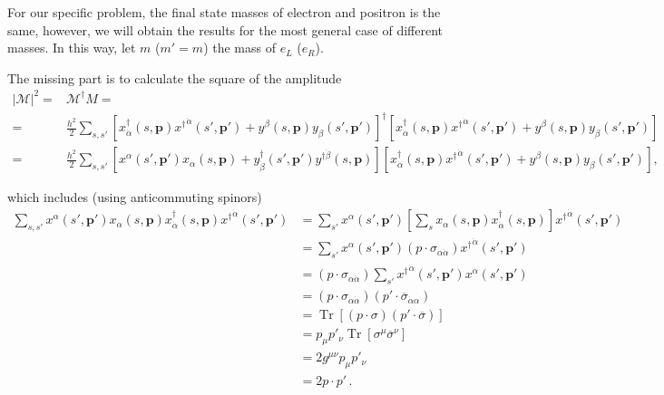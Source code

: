 For our specific problem, the final state masses of electron and positron is the same, however, we will obtain the results for the most general case of different masses. In this way, let $m$ ($m'=m$) the mass of $e_L$ ($e_R$).

The missing part is to calculate the square of the amplitude
\begin{align}
  \left| \mathcal{M} \right|^2=&\mathcal{M}^{\dagger}M= \nonumber\\
=&\frac{h^{2}}{2}\sum_{s,s'}
 \left[ x^{\dagger}_{\dot{\alpha}}(s,\boldsymbol{p}){x^{\dagger}}^{\dot{\alpha}}(s',\boldsymbol{p}')+y^{\beta}(s,\boldsymbol{p})y_{\beta}(s',\boldsymbol{p}') \right]^{\dagger}
\left[ x^{\dagger}_{\dot{\alpha}}(s,\boldsymbol{p}){x^{\dagger}}^{\dot{\alpha}}(s',\boldsymbol{p}')+y^{\beta}(s,\boldsymbol{p})y_{\beta}(s',\boldsymbol{p}') \right] \nonumber\\
  =&\frac{h^2}{2}\sum_{s,s'} \left[x^{\alpha}(s',\boldsymbol{p}') x_{\alpha}(s,\boldsymbol{p})+y^{\dagger}_{\dot{\beta}}(s',\boldsymbol{p}')y^{\dagger\dot{\beta}}(s,\boldsymbol{p}) \right]
\left[ x^{\dagger}_{\dot{\alpha}}(s,\boldsymbol{p}){x^{\dagger}}^{\dot{\alpha}}(s',\boldsymbol{p}')+y^{\beta}(s,\boldsymbol{p})y_{\beta}(s',\boldsymbol{p}') \right],
\end{align}

 which includes (using anticommuting spinors)
\begin{align}
\sum_{s,s'}x^{\alpha}(s',\boldsymbol{p}') x_{\alpha}(s,\boldsymbol{p})
x^{\dagger}_{\dot{\alpha}}(s,\boldsymbol{p}){x^{\dagger}}^{\dot{\alpha}}(s',\boldsymbol{p}') 
&= \sum_{s'}x^{\alpha}(s',\boldsymbol{p}')  \left[ 
\sum_{s} x_{\alpha}(s,\boldsymbol{p})x^{\dagger}_{\dot{\alpha}}(s,\boldsymbol{p})\right]
{x^{\dagger}}^{\dot{\alpha}}(s',\boldsymbol{p}')  \nonumber\\
&= \sum_{s'}x^{\alpha}(s',\boldsymbol{p}') \left( p\cdot \sigma_{\alpha{\dot{\alpha}}}  \right)
{x^{\dagger}}^{\dot{\alpha}}(s',\boldsymbol{p}')  \nonumber\\
&=\left( p\cdot \sigma_{\alpha{\dot{\alpha}}}  \right) \sum_{s'} {x^{\dagger}}^{\dot{\alpha}}(s',\boldsymbol{p}') x^{\alpha}(s',\boldsymbol{p}')  \nonumber\\
&=\left( p\cdot \sigma_{\alpha{\dot{\alpha}}}  \right) \left( p'\cdot \overline{\sigma}_{\dot{\alpha}\alpha} \right) \nonumber\\
&=\operatorname{Tr}\left[ \left( p\cdot \sigma \right)\left( p'\cdot \overline{\sigma} \right)  \right] \nonumber\\
&=p_{\mu}p'_{\nu}\operatorname{Tr}\left[ \sigma^{\mu} \overline{\sigma}^{\nu}  \right] \nonumber\\ 
&=2 g^{\mu\nu}p_{\mu}p'_{\nu} \nonumber\\
&=2 p\cdot p'\,.
\end{align}

